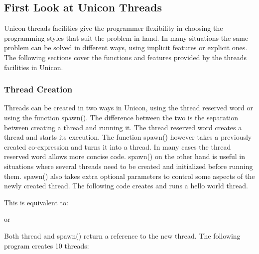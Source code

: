 \subsection[First Look at Unicon Threads]{First Look at Unicon Threads}

Unicon threads facilities give the programmer flexibility in choosing
the programming styles that suit the problem in hand. In many
situations the same problem can be solved in different ways, using
implicit features or explicit ones. The following sections cover the
functions and features provided by the threads facilities in Unicon.

\subsubsection{Thread Creation}

Threads can be created in two ways in Unicon, using the
\textsf{thread} reserved word or using the function
\textsf{spawn()}. The difference between the two is the
separation between creating a thread and running it. The thread
reserved word creates a thread and starts its execution. The function
\textsf{spawn()} however takes a previously created
co-expression and turns it into a thread. In many cases the thread
reserved word allows more concise code. \textsf{spawn()} on
the other hand is useful in situations where several threads need to be
created and initialized before running them.
\textsf{spawn()} also takes extra optional parameters
to control some aspects of the newly created thread. The following code
creates and runs a hello world thread.


This is equivalent to:


or


Both thread and \textsf{spawn()} return a reference to the
new thread. The following program creates 10 threads: 


